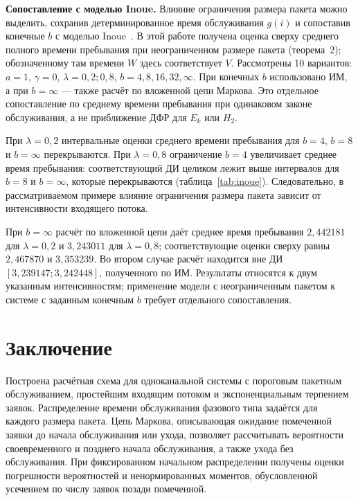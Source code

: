 \noindent\textbf{Сопоставление с моделью Inoue.}
Влияние ограничения размера пакета можно выделить, сохранив детерминированное время обслуживания $g(i)$ и сопоставив конечные $b$ с моделью Inoue~\cite{inoue2021}. В этой работе получена оценка сверху среднего полного времени пребывания при неограниченном размере пакета (теорема~2); обозначенному там времени $W$ здесь соответствует $V$. Рассмотрены 10 вариантов: $a=1$, $\gamma=0$, $\lambda=0{,}2;0{,}8$, $b=4,8,16,32,\infty$. При конечных $b$ использовано ИМ, а при $b=\infty$ --- также расчёт по вложенной цепи Маркова. Это отдельное сопоставление по среднему времени пребывания при одинаковом законе обслуживания, а не приближение ДФР для $E_k$ или $H_2$.

\begin{table}[htbp]\centering\small
\caption{Среднее время пребывания при детерминированном обслуживании $g(i)$, $a=1$, $\gamma=0$: ИМ, расчёт по вложенной цепи и оценка сверху}\label{tab:inoue}

\end{table}

При $\lambda=0{,}2$ интервальные оценки среднего времени пребывания для $b=4$, $b=8$ и $b=\infty$ перекрываются. При $\lambda=0{,}8$ ограничение $b=4$ увеличивает среднее время пребывания: соответствующий ДИ целиком лежит выше интервалов для $b=8$ и $b=\infty$, которые перекрываются (таблица~\ref{tab:inoue}). Следовательно, в рассматриваемом примере влияние ограничения размера пакета зависит от интенсивности входящего потока.

При $b=\infty$ расчёт по вложенной цепи даёт среднее время пребывания $2{,}442181$ для $\lambda=0{,}2$ и $3{,}243011$ для $\lambda=0{,}8$; соответствующие оценки сверху равны $2{,}467870$ и $3{,}353239$. Во втором случае расчёт находится вне ДИ $[3{,}239147;3{,}242448]$, полученного по ИМ. Результаты относятся к двум указанным интенсивностям; применение модели с неограниченным пакетом к системе с заданным конечным $b$ требует отдельного сопоставления.

\section*{Заключение}

Построена расчётная схема для одноканальной системы с пороговым пакетным обслуживанием, простейшим входящим потоком и экспоненциальным терпением заявок. Распределение времени обслуживания фазового типа задаётся для каждого размера пакета. Цепь Маркова, описывающая ожидание помеченной заявки до начала обслуживания или ухода, позволяет рассчитывать вероятности своевременного и позднего начала обслуживания, а также ухода без обслуживания. При фиксированном начальном распределении получены оценки погрешности вероятностей и ненормированных моментов, обусловленной усечением по числу заявок позади помеченной.


